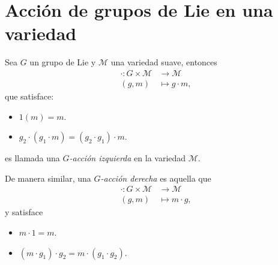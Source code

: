 
\section{Acci\'{o}n de grupos de Lie en una variedad}

\begin{mydef}
Sea $G$ un grupo de Lie y $\mathcal{M}$ una variedad suave, entonces
%
\begin{align*}
\cdot: G \times \mathcal{M} & \longrightarrow \mathcal{M} \\
(g, m) & \longmapsto g \cdot m,
\end{align*}
%
que satisface:
%
\begin{itemize}
\item{$1 (m) = m$.}
\item{$g_{2} \cdot (g_{1} \cdot m) = (g_{2} \cdot g_{1}) \cdot m$.}
\end{itemize}
es llamada una \emph{$G$-acci\'{o}n izquierda} en la variedad $\mathcal{M}$.
%
\end{mydef}

\begin{mydef}
De manera similar, una \emph{$G$-acci\'{o}n derecha} es aquella que
\begin{align*}
\cdot: G \times \mathcal{M} & \longrightarrow \mathcal{M}\\
(g, m) & \longmapsto m \cdot g,
\end{align*}
%
y satisface
%
\begin{itemize}
\item{$m \cdot 1 = m$.}
\item{$(m \cdot g_{1}) \cdot g_{2}= m \cdot (g_{1} \cdot g_{2})$.}
\end{itemize}
%
\end{mydef}

